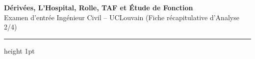 \newpage
\thispagestyle{plain}

\begin{center}
    {\LARGE\bfseries\color{uclblue} Dérivées, L'Hospital, Rolle, TAF et Étude de Fonction}\\[2pt]
    {\small\color{darkgray} Examen d'entrée Ingénieur Civil -- UCLouvain (Fiche récapitulative d'Analyse 2/4)}
    \vspace{2pt}
    \hrule height 1pt
\end{center}
\vspace{-6pt}

